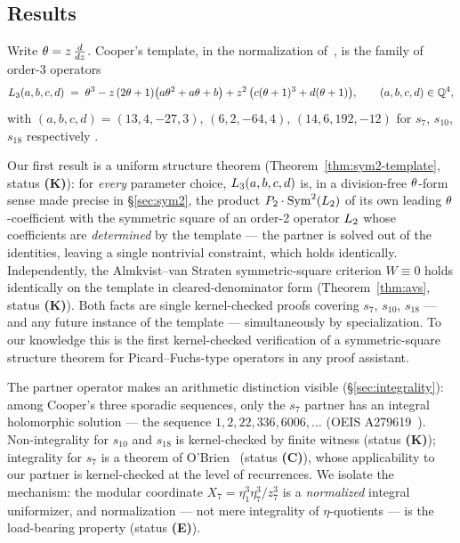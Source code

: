 \subsection{Results}

Write $\theta = z\,\frac{d}{dz}$. Cooper's template, in the normalization
of~\cite{Gorodetsky2023}, is the family of order-3 operators
\begin{equation}\label{eq:cooper-template}
  L_3(a,b,c,d)
  \;=\;
  \theta^3 - z\,(2\theta+1)\bigl(a\theta^2 + a\theta + b\bigr)
  + z^2\,\bigl(c(\theta+1)^3 + d(\theta+1)\bigr),
  \qquad (a,b,c,d)\in\mathbb{Q}^4,
\end{equation}
with $(a,b,c,d) = (13,4,-27,3)$, $(6,2,-64,4)$, $(14,6,192,-12)$ for $s_7$,
$s_{10}$, $s_{18}$ respectively \cite{Cooper2012,Gorodetsky2023}.

Our first result is a uniform structure theorem
(Theorem~\ref{thm:sym2-template}, status \textbf{(K)}): for \emph{every}
parameter choice, $L_3(a,b,c,d)$ is, in a division-free
$\theta$-form sense made precise in \S\ref{sec:sym2}, the product
$P_2\cdot\operatorname{Sym}^2(L_2)$ of its own leading $\theta$-coefficient with the
symmetric square of an order-2 operator $L_2$ whose coefficients are
\emph{determined} by the template --- the partner is solved out of the
identities, leaving a single nontrivial constraint, which holds identically.
Independently, the Almkvist--van Straten symmetric-square criterion $W\equiv 0$
holds identically on the template in cleared-denominator form
(Theorem~\ref{thm:avs}, status \textbf{(K)}). Both facts are single
kernel-checked proofs covering $s_7$, $s_{10}$, $s_{18}$ --- and any future
instance of the template --- simultaneously by specialization. To our
knowledge this is the first kernel-checked verification of a symmetric-square
structure theorem for Picard--Fuchs-type operators in any proof assistant.

The partner operator makes an arithmetic distinction visible
(\S\ref{sec:integrality}): among Cooper's three sporadic sequences, only the
$s_7$ partner has an integral holomorphic solution --- the sequence
$1, 2, 22, 336, 6006, \dots$ (OEIS A279619~\cite{OEIS}). Non-integrality for
$s_{10}$ and $s_{18}$ is kernel-checked by finite witness (status
\textbf{(K)}); integrality for $s_7$ is a theorem of
O'Brien~\cite{OBrien2016} (status \textbf{(C)}), whose applicability to our
partner is kernel-checked at the level of recurrences. We isolate the
mechanism: the modular coordinate $X_7 = \eta_1^3\eta_7^3/z_7^3$ is a
\emph{normalized} integral uniformizer, and normalization --- not mere
integrality of $\eta$-quotients --- is the load-bearing property (status
\textbf{(E)}).

